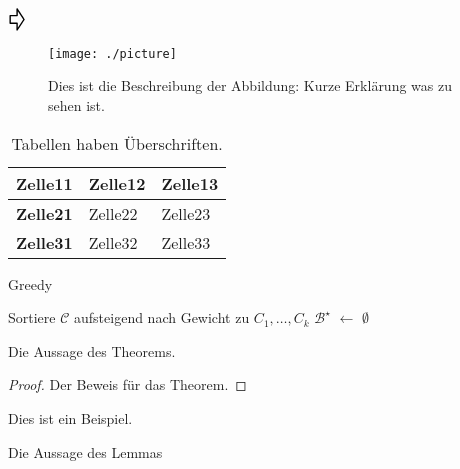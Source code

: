 \documentclass[a4paper,ngerman]{atseminar}
\newcommand*{\vinput}[1]{\vcenter{\hbox{}}}
\newcommand*{\vpointer}{\vcenter{\hbox{\scalebox{1}{\Huge\pointer}}}}
\begin{document}
$\vinput{dependence_graph} \vpointer  \vinput{plate_dependence_graph}$


%




\begin{figure}[h]
 \centering
 \texttt{[image: ./picture]}
 \caption{Dies ist die Beschreibung der Abbildung: Kurze Erklärung
was zu sehen ist.}
 \label{XY:fig:picture}
\end{figure}

\begin{table}[h]
\centering
\caption{Tabellen haben Überschriften.}
\begin{tabular}{l|ll}
  \textbf{Zelle11} & \textbf{Zelle12} & \textbf{Zelle13} \\
  \hline
  \textbf{Zelle21} & Zelle22 & Zelle23 \\
  \textbf{Zelle31} & Zelle32 & Zelle33 \\
  
\end{tabular}
\label{XY:tab:interessant}
\end{table}



\begin{algorithm}[H]
\caption{Greedy}
Sortiere $\mathcal{C}$ aufsteigend nach Gewicht zu $C_1,\ldots,C_k$\; 
$\mathcal{B}^\star$ $\leftarrow$ $\emptyset$\; %
\end{algorithm}

\begin{theorem}
 Die Aussage des Theorems.
\end{theorem}

\begin{proof}
 Der Beweis für das Theorem.
\end{proof}

\begin{example}
 Dies ist ein Beispiel.
\end{example}


\begin{lemma}
 Die Aussage des Lemmas
\end{lemma}
\end{document}
